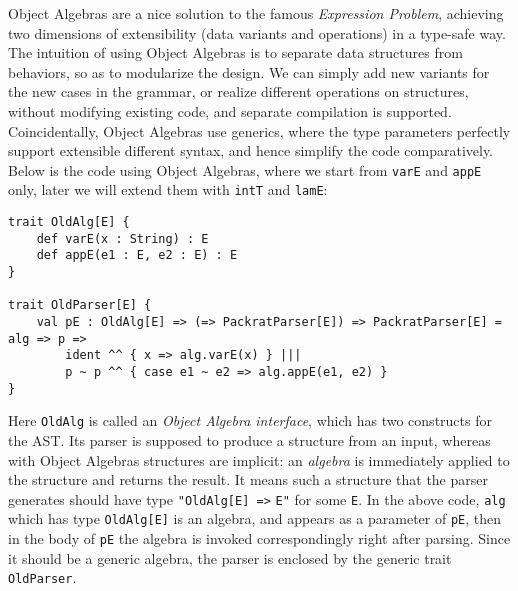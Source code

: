 Object Algebras are a nice solution to the famous \textit{Expression Problem}, achieving two dimensions of extensibility (data variants and operations)
in a type-safe way. The intuition of using Object Algebras is to separate data structures from behaviors, so as to modularize the design. We can simply add new variants for the new cases in the grammar, or realize different operations on structures, without modifying existing code, and separate compilation is supported. Coincidentally, Object Algebras use generics, where the type parameters perfectly support extensible different syntax, and hence simplify the code comparatively. Below is the code using Object Algebras, where we start from \lstinline{varE} and \lstinline{appE} only, later we will extend them with \lstinline{intT} and \lstinline{lamE}:
\begin{lstlisting}
trait OldAlg[E] {
    def varE(x : String) : E
    def appE(e1 : E, e2 : E) : E
}

trait OldParser[E] {
    val pE : OldAlg[E] => (=> PackratParser[E]) => PackratParser[E] = alg => p =>
        ident ^^ { x => alg.varE(x) } |||
        p ~ p ^^ { case e1 ~ e2 => alg.appE(e1, e2) }
}
\end{lstlisting}
Here \lstinline{OldAlg} is called an \textit{Object Algebra interface}, which has two constructs for the AST. Its parser is
supposed to produce a structure from an input, whereas with Object Algebras structures are implicit: an \textit{algebra}
is immediately applied to the structure and returns the result. It means such a structure that the parser generates should have
type \lstinline{"OldAlg[E] =>} \lstinline{E"} for some \lstinline{E}. In the above code, \lstinline{alg} which has type
\lstinline{OldAlg[E]} is an algebra, and appears as a parameter of \lstinline{pE}, then in the body of \lstinline{pE} the algebra
is invoked correspondingly right after parsing. Since it should be a generic algebra, the parser is enclosed by the generic trait \lstinline{OldParser}.

